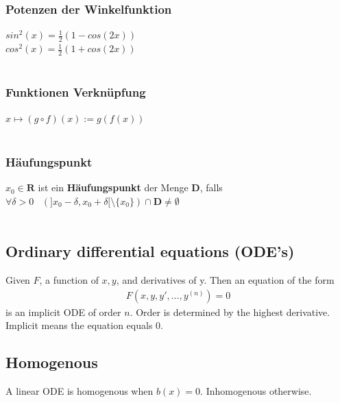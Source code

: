 \documentclass[8pt]{extarticle}
\begin{document}
\begin{multicols*}{3}
    \subsubsection {Potenzen der Winkelfunktion}
  
  $sin^2(x) = \frac{1}{2} (1 - cos(2x))$\\
  $cos^2(x) = \frac{1}{2} (1 + cos(2x))$\\
  \\

    \subsubsection {Funktionen Verknüpfung}
  
  $
    x \mapsto (g \circ f)(x) := g(f(x))
  $\\ \\

    \subsubsection {Häufungspunkt}
  
  $x_0 \in \mathbf{R}$ ist ein \textbf{Häufungspunkt} der Menge $\mathbf{D}$,
  falls $\forall \delta > 0 \;\;\; (]x_0 - \delta, x_0 + \delta[ \setminus \{x_0\}) \cap \mathbf{D} \neq \emptyset$\\ \\

  \subsection{Ordinary differential equations (ODE's)}
  Given $F$, a function of $x, y$, and derivatives of y.
  Then an equation of the form
  \begin{align*}
    F(x, y, y', \dots, y^{(n)}) = 0
  \end{align*}
  is an implicit ODE of order $n$. Order is determined
  by the highest derivative. Implicit means the
  equation equals $0$.

\subsection{Homogenous}
A linear ODE is homogenous when $b(x) = 0$.
Inhomogenous otherwise.
\end{multicols*}
\end{document}
